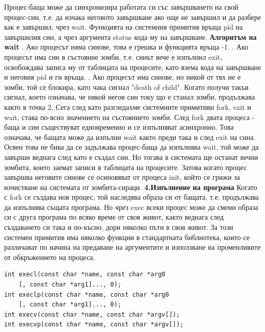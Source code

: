 \documentclass{article}
\begin{document}
Процес-баща може да синхронизира работата си със завършването на свой процес-син, т.е. да изчака неговото завършване ако още не
завършил и да разбере как е завършил, чрез wait. Функцията на системния примитив връща pid на завършилия син, а чрез аргумента
status кода му на завършване. \newline\newline
\textbf{Алгоритъм на wait} \newline{}. Ако процесът няма синове, това е грешка и функцията връща -1. . Ако процесът има син в състояние зомби, т.е. синът вече е изпълнил exit, освобождава записа му от таблицата на процесите,
като взема кода на завършване и неговия pid и ги връща. . Ако процесът има синове, но никой от тях не е зомби, той се блокира, като чака сигнал "death of child". Когато получи такъв
сигнал, което означава, че някой негов син току що е станал зомби, продължава както в точка 2. \newline
Сега след като разгледахме системните примитиви fork, exit и wait, става по-ясно значението на състоянието зомби. След fork двата
процеса - баща и син съществуват едновременно и се изпълняват асинхронно. Това означава, че бащата може да изпълни wait както
преди така и след exit на сина. Освен това не бива да се задължава процес-баща да изпълнява wait, той може да завърши веднага
след като е създал син. Но тогава в системата ще останат вечни зомбита, които заемат записи в таблицата на процесите. Затова
когато процес завършва неговите синове се осиновяват от процеса init, който се грижи за изчистване на системата от зомбита-сираци. \newline\newline
\textbf{4.Изпълнение на програма} \newline\newline
Когато с fork се създава нов процес, той наследява образа си от бащата, т.е. продължава да изпълнява същата програма. Но чрез
exec всеки процес може да смени образа си с друга програма по всяко време от своя живот, както веднага след създаването си така и
по-късно, дори няколко пъти в своя живот. За този системен примитив има няколко функции в стандартната библиотека, които се
различават по начина на предаване на аргументите и използване на променливите от обкръжението на процеса.
\begin{lstlisting}[style=CStyle]
int execl(const char *name, const char *arg0
    [, const char *arg1]..., 0);
int execlp(const char *name, const char *arg0
    [, const char *arg1]..., 0);
int execv(const char *name, const char *argv[]);
int execvp(const char *name, const char *argv[]);
\end{lstlisting}
\end{document}
